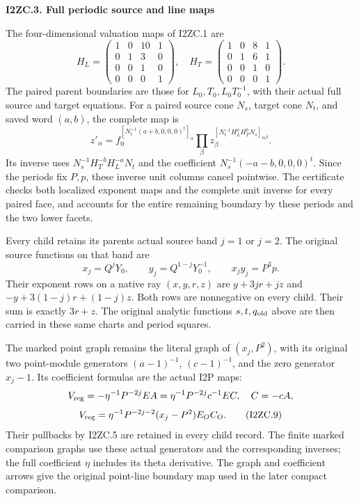 \par

\medskip\noindent\textbf{I2ZC.3. Full periodic source and line maps}

\par\nobreak

The four-dimensional valuation maps of I2ZC.1 are
\[
 H_L=\begin{pmatrix}1&0&10&1\\0&1&3&0\\0&0&1&0\\0&0&0&1\end{pmatrix},
 \quad
 H_T=\begin{pmatrix}1&0&8&1\\0&1&6&1\\0&0&1&0\\0&0&0&1\end{pmatrix}.
\]
The paired parent boundaries are those for \(L_0,T_0,L_0T_0^{-1}\),
with their actual full source and target equations. For a paired
source cone \(N_s\), target cone \(N_t\), and saved word
\((a,b)\), the complete map is
\[
 z'_\alpha=
 f_0^{[N_t^{-1}(a+b,0,0,0)^t]_\alpha}
 \prod_\beta z_\beta^{[N_t^{-1}H_L^aH_T^bN_s]_{\alpha\beta}}.
 \tag{I2ZC.7}
\]
Its inverse uses \(N_s^{-1}H_T^{-b}H_L^{-a}N_t\) and the
coefficient \(N_s^{-1}(-a-b,0,0,0)^t\). Since the periods fix
\(P,p\), these inverse unit columns cancel pointwise. The
certificate checks both localized exponent maps and the complete
unit inverse for every paired face, and accounts for the entire
remaining boundary by these periods and the two lower facets.

Every child retains its parent\textquotesingle s actual source band \(j=1\) or
\(j=2\). The original source functions on that band are
\[
 x_j=Q^jY_0,\qquad y_j=Q^{1-j}Y_0^{-1},\qquad x_jy_j=P^3p.
 \tag{I2ZC.8}
\]
Their exponent rows on a native ray \((x,y,r,z)\) are
\(y+3jr+jz\) and \(-y+3(1-j)r+(1-j)z\). Both rows are
nonnegative on every child. Their sum is exactly \(3r+z\).
The original analytic functions \(s,t,q_{\rm old}\) above are
then carried in these same charts and period squares.

The marked point graph remains the literal graph of
\((x_j,P^2)\), with its original two point-module generators
\((a-1)^{-1}\), \((c-1)^{-1}\), and the zero generator
\(x_j-1\). Its coefficient formulas are the actual I2P maps:
\[
 V_{\rm reg}=-\eta^{-1}P^{-2j}EA
 =\eta^{-1}P^{-2j}c^{-1}EC,\quad C=-cA,
\]
\[
 V_{\rm reg}=\eta^{-1}P^{-2j-2}(x_j-P^2)E_OC_O.
 \tag{I2ZC.9}
\]
Their pullbacks by I2ZC.5 are retained in every child record.
The finite marked comparison graphs use these actual generators
and the corresponding inverses; the full coefficient \(\eta\)
includes its theta derivative. The graph and coefficient arrows
give the original point-line boundary map used in the later
compact comparison.


